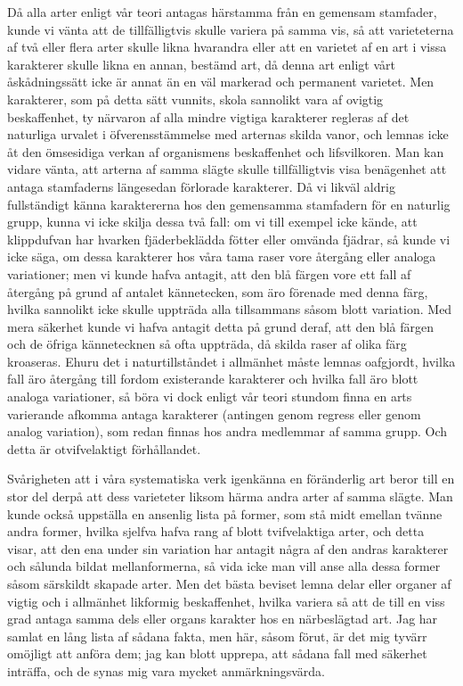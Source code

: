 Då alla arter enligt vår teori antagas härstamma från en gemensam stamfader, kunde vi vänta att de tillfälligtvis skulle variera på samma vis, så att varieteterna af två eller flera arter skulle likna hvarandra eller att en varietet af en art i vissa karakterer skulle likna en annan, bestämd art, då denna art enligt vårt åskådningssätt icke är annat än en väl markerad och permanent varietet. Men karakterer, som på detta sätt vunnits, skola sannolikt vara af ovigtig beskaffenhet, ty närvaron af alla mindre vigtiga karakterer regleras af det naturliga urvalet i öfverensstämmelse med arternas skilda vanor, och lemnas icke åt den ömsesidiga verkan af organismens beskaffenhet och lifsvilkoren. Man kan vidare vänta, att arterna af samma slägte skulle tillfälligtvis visa benägenhet att antaga stamfaderns längesedan förlorade karakterer. Då vi likväl aldrig fullständigt känna karaktererna hos den gemensamma stamfadern för en naturlig grupp, kunna vi icke skilja dessa två fall: om vi till exempel icke kände, att klippdufvan har hvarken fjäderbeklädda fötter eller omvända fjädrar, så kunde vi icke säga, om dessa karakterer hos våra tama raser vore återgång eller analoga variationer; men vi kunde hafva antagit, att den blå färgen vore ett fall af återgång på grund af antalet kännetecken, som äro förenade med denna färg, hvilka sannolikt icke skulle uppträda alla tillsammans såsom blott variation. Med mera säkerhet kunde vi hafva antagit detta på grund deraf, att den blå färgen och de öfriga kännetecknen så ofta uppträda, då skilda raser af olika färg kroaseras. Ehuru det i naturtillståndet i allmänhet måste lemnas oafgjordt, hvilka fall äro återgång till fordom existerande karakterer och hvilka fall äro blott analoga variationer, så böra vi dock enligt vår teori stundom finna en arts varierande afkomma antaga karakterer (antingen genom regress eller genom analog variation), som redan finnas hos andra medlemmar af samma grupp. Och detta är otvifvelaktigt förhållandet.

Svårigheten att i våra systematiska verk igenkänna en föränderlig art beror till en stor del derpå att dess varieteter liksom härma andra arter af samma slägte. Man kunde också uppställa en ansenlig lista på former, som stå midt emellan tvänne andra former, hvilka sjelfva hafva rang af blott tvifvelaktiga arter, och detta visar, att den ena under sin variation har antagit några af den andras karakterer och sålunda bildat mellanformerna, så vida icke man vill anse alla dessa former såsom särskildt skapade arter. Men det bästa beviset lemna delar eller organer af vigtig och i allmänhet likformig beskaffenhet, hvilka variera så att de till en viss grad antaga samma dels eller organs karakter hos en närbeslägtad art. Jag har samlat en lång lista af sådana fakta, men här, såsom förut, är det mig tyvärr omöjligt att anföra dem; jag kan blott upprepa, att sådana fall med säkerhet inträffa, och de synas mig vara mycket anmärkningsvärda.

